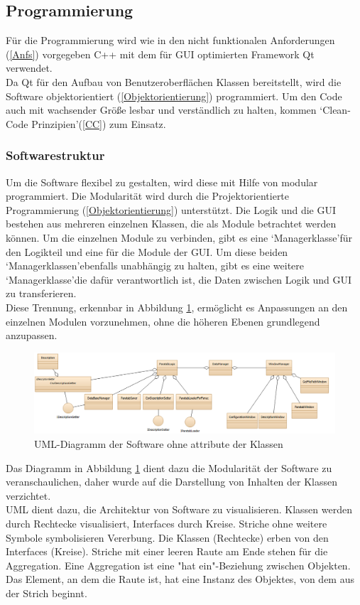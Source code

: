 \subsection{Programmierung}
Für die Programmierung wird wie in den nicht funktionalen Anforderungen (\ref{Anfs}) vorgegeben C++ mit dem für \ac{GUI} optimierten Framework Qt verwendet. \\
Da Qt für den Aufbau von Benutzeroberflächen Klassen bereitstellt, wird die Software objektorientiert (\ref{Objektorientierung}) programmiert. Um den Code auch mit wachsender Größe lesbar und verständlich zu halten, kommen \lq Clean-Code Prinzipien\rq\space(\ref{CC}) zum Einsatz.\\
\subsubsection{Softwarestruktur}
Um die Software flexibel zu gestalten, wird diese mit Hilfe von modular programmiert. Die Modularität wird durch die Projektorientierte Programmierung (\ref{Objektorientierung}) unterstützt. Die Logik und die \ac{GUI} bestehen aus mehreren einzelnen Klassen, die als Module betrachtet werden können. Um die einzelnen Module zu verbinden, gibt es eine \lq Managerklasse\rq\space für den Logikteil und eine für die Module der \ac{GUI}. Um diese beiden \lq Managerklassen\rq\space ebenfalls unabhängig zu halten, gibt es eine weitere \lq Managerklasse\rq\space die dafür verantwortlich ist, die Daten zwischen Logik und \ac{GUI} zu transferieren. \\
Diese Trennung, erkennbar in Abbildung \ref{fig:UML}, ermöglicht es Anpassungen an den einzelnen Modulen vorzunehmen, ohne die höheren Ebenen grundlegend anzupassen.
\begin{figure}[H]\includegraphics[page=1,scale=0.49]{pictures_and_research/Bilder/uml.PNG}
\caption{\ac{UML}-Diagramm der Software ohne attribute der Klassen}
\label{fig:UML}
\end{figure}\noindent
Das Diagramm in Abbildung \ref{fig:UML} dient dazu die Modularität der Software zu veranschaulichen, daher wurde auf die Darstellung von Inhalten der Klassen verzichtet.\\
\ac{UML} dient dazu, die Architektur von Software zu visualisieren. Klassen werden durch Rechtecke visualisiert, Interfaces durch Kreise. Striche ohne weitere Symbole symbolisieren Vererbung. Die Klassen (Rechtecke) erben von den Interfaces (Kreise). Striche mit einer leeren Raute am Ende stehen für die Aggregation. Eine Aggregation ist eine "hat ein"-Beziehung zwischen Objekten. Das Element, an dem die Raute ist, hat eine Instanz des Objektes, von dem aus der Strich beginnt.

